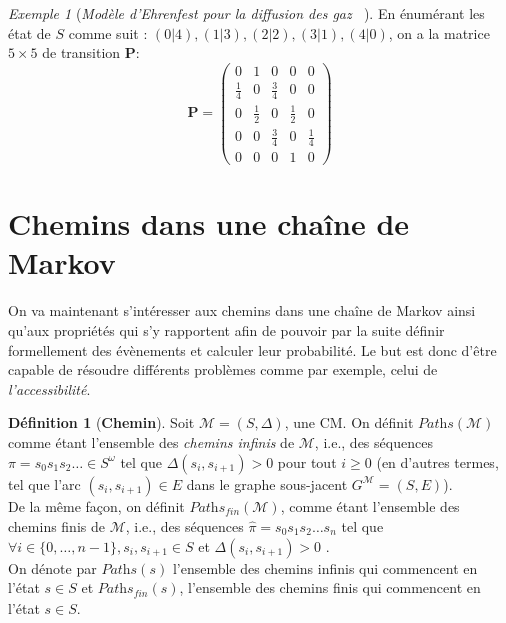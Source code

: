 \documentclass[12pt,a4paper]{report}
\theoremstyle{definition}%
\newtheorem{definition}{Définition}[chapter]
\theoremstyle{remark}
\newtheorem{example}{Exemple}[chapter]
\newcommand{\ie}{i.e., }
\begin{document}
\begin{example}[\textit{Modèle d'Ehrenfest pour la diffusion des gaz ~\cite{Course3}}]
	En énumérant les état de $S$ comme suit : $(0|4), (1|3), (2|2), (3|1), (4|0)$, on a la matrice $5\times5$ de transition $\textbf{P}$:
	\[
		\textbf{P} =
			\begin{pmatrix}
			0 & 1 & 0 & 0 & 0 \\
			\frac{1}{4} & 0 & \frac{3}{4}& 0 & 0 \\
			0 & \frac{1}{2} & 0 & \frac{1}{2} & 0 \\
			0 & 0 & \frac{3}{4} & 0 & \frac{1}{4} \\
			0 & 0 & 0 & 1 & 0
			\end{pmatrix}
	\]
\end{example}

\section{Chemins dans une chaîne de Markov}
On va maintenant s'intéresser aux chemins dans une chaîne de Markov ainsi qu'aux propriétés qui s'y rapportent afin de pouvoir par la suite définir formellement des évènements et calculer leur probabilité. Le but est donc d'être capable de résoudre différents problèmes comme par exemple, celui de \textit{l'accessibilité}.

\begin{definition}[\textbf{Chemin}]
	Soit $\mathcal{M} = (S, \Delta)$, une CM.
	On définit $\textit{Paths}(\mathcal{M})$ comme étant l'ensemble des \textit{chemins infinis} de $\mathcal{M}$, \ie des séquences $\pi = s_0 s_1 s_2 \dots \in S^\omega$ tel que $\Delta(s_i, s_{i+1}) > 0$ pour tout $i \geq 0$ (en d'autres termes, tel que l'arc $(s_i, s_{i+1}) \in E$ dans le graphe sous-jacent $G^\mathcal{M} = (S, E)$).\\
	De la même façon, on définit $\textit{Paths}_\textit{fin}(\mathcal{M})$, comme étant l'ensemble des chemins finis de $\mathcal{M}$, \ie des séquences $\hat{\pi} = s_0 s_1 s_2 \dots s_n$ tel que $\forall i \in \{0, \dots, n-1\}, s_i, s_{i+1} \in S$ et $\Delta(s_i, s_{i+1}) > 0$ .\\
	On dénote par $\textit{Paths}(s)$ l'ensemble des chemins infinis qui commencent en l'état $s \in S$ et $\textit{Paths}_\textit{fin}(s)$, l'ensemble des chemins finis qui commencent en l'état $s \in S$.
\end{definition}
\end{document}
